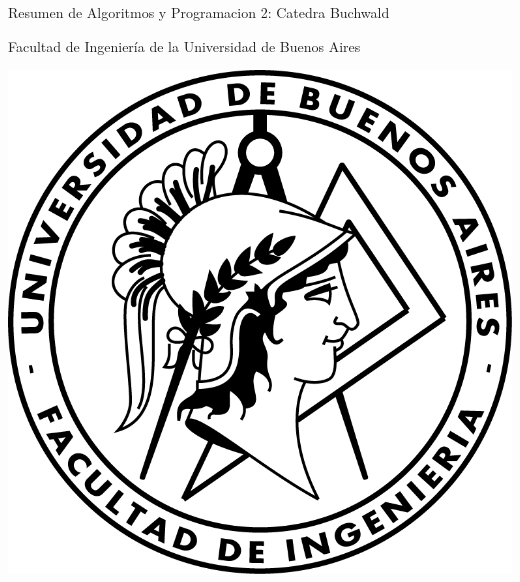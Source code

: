 \documentclass{article}
\begin{document}
\begin{titlepage}
  \vspace*{1cm}

  \begin{center}
    {\Huge{Resumen de Algoritmos y Programacion 2: Catedra Buchwald}}
  \end{center}

  \vspace{0.4cm}

  \begin{center}
    {\LARGE{Facultad de Ingeniería de la Universidad de Buenos Aires}}\\
    \vspace{0.3cm}
  \end{center}

  \vspace{0.8cm}
  \begin{center}
    \includegraphics[scale=0.8]{Logo-fiuba}
  \end{center}


\end{titlepage}
\end{document}
